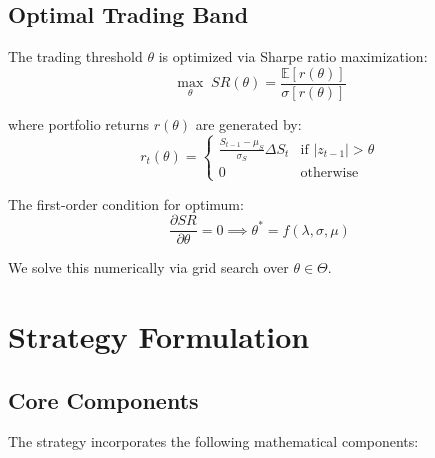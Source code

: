 \documentclass[12pt]{article}
\begin{document}
\subsection{Optimal Trading Band}

The trading threshold $\theta$ is optimized via Sharpe ratio maximization:
\begin{equation}
\max_{\theta} \; SR(\theta) = \frac{\mathbb{E}[r(\theta)]}{\sigma[r(\theta)]}
\end{equation}

where portfolio returns $r(\theta)$ are generated by:
\begin{equation}
r_t(\theta) = \begin{cases} 
\frac{S_{t-1} - \mu_S}{\sigma_S} \Delta S_t & \text{if } |z_{t-1}| > \theta \\
0 & \text{otherwise}
\end{cases}
\end{equation}

The first-order condition for optimum:
\begin{equation}
\frac{\partial SR}{\partial \theta} = 0 \implies \theta^* = f(\lambda, \sigma, \mu)
\end{equation}

We solve this numerically via grid search over $\theta \in \Theta$.

\section{Strategy Formulation}

\subsection{Core Components}

The strategy incorporates the following mathematical components:
\end{document}
